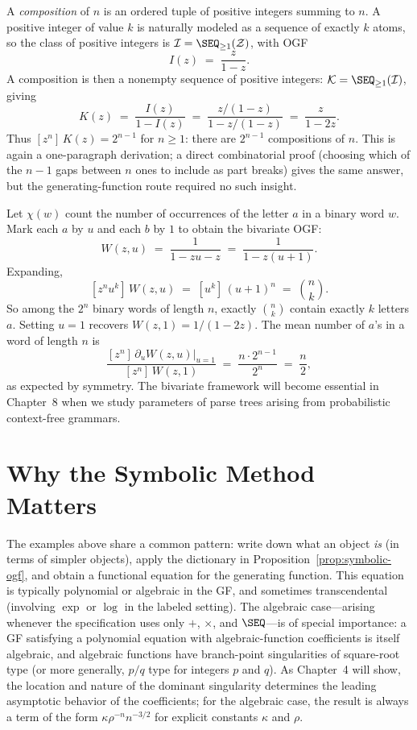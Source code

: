 \begin{example}
A \emph{composition} of $n$ is an ordered tuple of positive integers summing to
$n$.  A positive integer of value $k$ is naturally modeled as a sequence of
exactly $k$ atoms, so the class of positive integers is
$\mathcal{I} = \SEQ_{\ge 1}(\mathcal{Z})$, with OGF
\[
  I(z) \;=\; \frac{z}{1 - z}.
\]
A composition is then a nonempty sequence of positive integers:
$\mathcal{K} = \SEQ_{\ge 1}(\mathcal{I})$, giving
\[
  K(z)
  \;=\; \frac{I(z)}{1 - I(z)}
  \;=\; \frac{z/(1-z)}{1 - z/(1-z)}
  \;=\; \frac{z}{1 - 2z}.
\]
Thus $[z^n]\,K(z) = 2^{n-1}$ for $n \ge 1$: there are $2^{n-1}$ compositions of
$n$.  This is again a one-paragraph derivation; a direct combinatorial proof
(choosing which of the $n-1$ gaps between $n$ ones to include as part breaks) gives
the same answer, but the generating-function route required no such insight.
\end{example}

\begin{example}
Let $\chi(w)$ count the number of occurrences of the letter $a$ in a binary word
$w$.  Mark each $a$ by $u$ and each $b$ by $1$ to obtain the bivariate OGF:
\[
  W(z, u)
  \;=\; \frac{1}{1 - zu - z}
  \;=\; \frac{1}{1 - z(u + 1)}.
\]
Expanding,
\[
  [z^n u^k]\, W(z,u)
  \;=\; [u^k]\,(u+1)^n
  \;=\; \binom{n}{k}.
\]
So among the $2^n$ binary words of length $n$, exactly $\binom{n}{k}$ contain
exactly $k$ letters $a$.  Setting $u = 1$ recovers $W(z,1) = 1/(1-2z)$.  The mean
number of $a$'s in a word of length $n$ is
\[
  \frac{[z^n]\,\partial_u W(z,u)\big|_{u=1}}{[z^n]\,W(z,1)}
  \;=\; \frac{n \cdot 2^{n-1}}{2^n}
  \;=\; \frac{n}{2},
\]
as expected by symmetry.  The bivariate framework will become essential in
Chapter~8 when we study parameters of parse trees arising from probabilistic
context-free grammars.
\end{example}

\section{Why the Symbolic Method Matters}

The examples above share a common pattern: write down what an object \emph{is}
(in terms of simpler objects), apply the dictionary in Proposition~\ref{prop:symbolic-ogf},
and obtain a functional equation for the generating function.  This equation is
typically polynomial or algebraic in the GF, and sometimes transcendental
(involving $\exp$ or $\log$ in the labeled setting).  The algebraic case---arising
whenever the specification uses only $+$, $\times$, and $\SEQ$---is of special
importance: a GF satisfying a polynomial equation with algebraic-function
coefficients is itself algebraic, and algebraic functions have branch-point
singularities of square-root type (or more generally, $p/q$ type for integers $p$
and $q$).  As Chapter~4 will show, the location and nature of the dominant
singularity determines the leading asymptotic behavior of the coefficients; for the
algebraic case, the result is always a term of the form $\kappa \rho^{-n} n^{-3/2}$
for explicit constants $\kappa$ and $\rho$.

